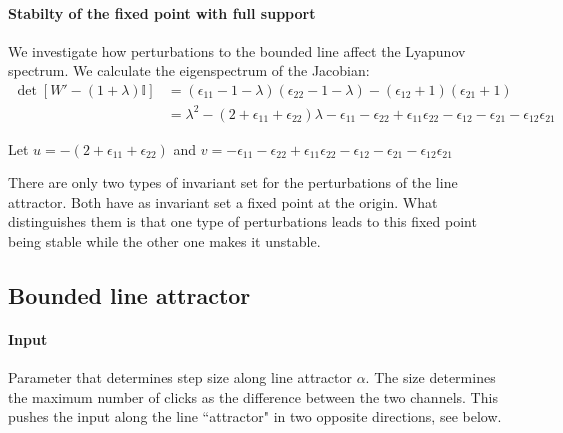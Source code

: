 \documentclass{article} %
\newcounter{ct}
\newcommand{\win}{\vW_{\text{in}}}
\newcommand{\wout}{\vW_{\text{out}}}
\newcommand{\bout}{\vb_{\text{out}}}
\theoremstyle{definition}
\theoremstyle{remark}
\begin{document}
\paragraph{Stabilty of the fixed point with full support}
We investigate how perturbations to the bounded line affect the Lyapunov spectrum.
We calculate the eigenspectrum of the Jacobian:
\begin{align*}
\det [W' -(1+\lambda)\mathbb{I}] &= (\epsilon_{11}-1-\lambda)(\epsilon_{22}-1-\lambda)-(\epsilon_{12}+1)(\epsilon_{21}+1)\\
&=\lambda^2 - (2+\epsilon_{11}+\epsilon_{22})\lambda -\epsilon_{11}-\epsilon_{22}+\epsilon_{11}\epsilon_{22} -\epsilon_{12} - \epsilon_{21} - \epsilon_{12}\epsilon_{21}
\end{align*}

Let 
$u=- (2+\epsilon_{11}+\epsilon_{22})$
and 
$v=-\epsilon_{11}-\epsilon_{22}+\epsilon_{11}\epsilon_{22} -\epsilon_{12} - \epsilon_{21} - \epsilon_{12}\epsilon_{21}$

There are only two types of invariant set for the perturbations of the line attractor. Both have as invariant set a fixed point at the origin. What distinguishes them is that one type of perturbations leads to this fixed point being stable while the other one makes it unstable.



\subsection{Bounded line attractor}\label{sec:supp:bla}

\paragraph{Input}
Parameter that determines step size along line attractor $\alpha$.
The size determines the maximum number of clicks as the difference between the two channels. 
This pushes the input along the line ``attractor" in two opposite directions, %
see below.

%
\end{document}
